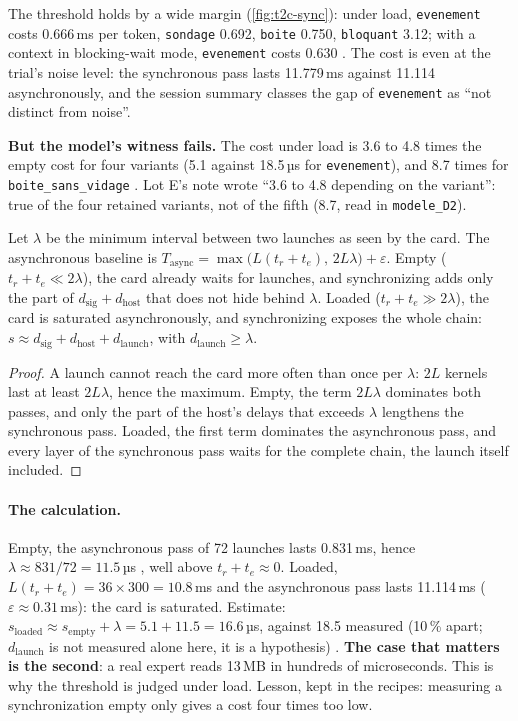 The threshold holds by a wide margin (\cref{fig:t2c-sync}): under load, \texttt{evenement} costs 0.666\,ms per token, \texttt{sondage} 0.692, \texttt{boite} 0.750, \texttt{bloquant} 3.12; with a context in blocking-wait mode, \texttt{evenement} costs 0.630 \mes. The cost is even at the trial's noise level: the synchronous pass lasts 11.779\,ms against 11.114 asynchronously, and the session summary classes the gap of \texttt{evenement} as ``not distinct from noise''.

\textbf{But the model's witness fails.} The cost under load is 3.6 to 4.8 times the empty cost for four variants (5.1 against 18.5\,µs for \texttt{evenement}), and 8.7 times for \texttt{boite\_\allowbreak sans\_\allowbreak vidage} \mes.  Lot E's note wrote ``3.6 to 4.8 depending on the variant'': true of the four retained variants, not of the fifth (8.7, read in \texttt{modele\_D2}).

\begin{proposition}\label{prop:t2c-d2bis}
Let $\lambda$ be the minimum interval between two launches as seen by the card. The asynchronous baseline is $T_{\mathrm{async}} = \max\bigl(L(t_r + t_e),\, 2L\lambda\bigr) + \varepsilon$. Empty ($t_r + t_e \ll 2\lambda$), the card already waits for launches, and synchronizing adds only the part of $d_{\mathrm{sig}} + d_{\mathrm{host}}$ that does not hide behind $\lambda$. Loaded ($t_r + t_e \gg 2\lambda$), the card is saturated asynchronously, and synchronizing exposes the whole chain: $s \approx d_{\mathrm{sig}} + d_{\mathrm{host}} + d_{\mathrm{launch}}$, with $d_{\mathrm{launch}} \ge \lambda$.
\end{proposition}

\begin{proof}
A launch cannot reach the card more often than once per $\lambda$: $2L$ kernels last at least $2L\lambda$, hence the maximum. Empty, the term $2L\lambda$ dominates both passes, and only the part of the host's delays that exceeds $\lambda$ lengthens the synchronous pass. Loaded, the first term dominates the asynchronous pass, and every layer of the synchronous pass waits for the complete chain, the launch itself included.
\end{proof}

\paragraph{The calculation.} Empty, the asynchronous pass of 72 launches lasts 0.831\,ms, hence $\lambda \approx 831/72 = 11.5$\,µs \mes, well above $t_r + t_e \approx 0$. Loaded, $L(t_r + t_e) = 36 \times 300 = 10.8$\,ms and the asynchronous pass lasts 11.114\,ms ($\varepsilon \approx 0.31$\,ms): the card is saturated. Estimate: $s_{\mathrm{loaded}} \approx s_{\mathrm{empty}} + \lambda = 5.1 + 11.5 = 16.6$\,µs, against 18.5 measured (10\,\% apart; $d_{\mathrm{launch}}$ is not measured alone here, it is a hypothesis) \calc. \textbf{The case that matters is the second}: a real expert reads 13\,MB in hundreds of microseconds. This is why the threshold is judged under load. Lesson, kept in the recipes: measuring a synchronization empty only gives a cost four times too low.

